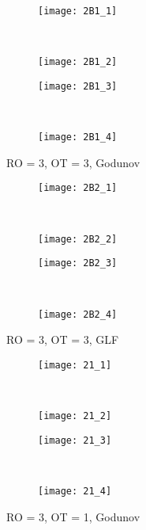 \documentclass[10pt,letterpaper,fleqn]{article}
\begin{document}
\begin{figure}[h!]
        \centering
        \begin{subfigure}[b]{0.4\textwidth}
                \texttt{[image: 2B1\_1]}
        \end{subfigure}%
        ~ 
        \begin{subfigure}[b]{0.4\textwidth}
                \texttt{[image: 2B1\_2]}
        \end{subfigure}
        
        \begin{subfigure}[b]{0.4\textwidth}
                \texttt{[image: 2B1\_3]}
        \end{subfigure}
        ~
        \begin{subfigure}[b]{0.4\textwidth}
                \texttt{[image: 2B1\_4]}
        \end{subfigure}
        \caption{RO = 3, OT = 3, Godunov}
\end{figure}

\begin{figure}[h!]
        \centering
        \begin{subfigure}[b]{0.4\textwidth}
                \texttt{[image: 2B2\_1]}
        \end{subfigure}%
        ~ 
        \begin{subfigure}[b]{0.4\textwidth}
                \texttt{[image: 2B2\_2]}
        \end{subfigure}
        
        \begin{subfigure}[b]{0.4\textwidth}
                \texttt{[image: 2B2\_3]}
        \end{subfigure}
        ~
        \begin{subfigure}[b]{0.4\textwidth}
                \texttt{[image: 2B2\_4]}
        \end{subfigure}
        \caption{RO = 3, OT = 3, GLF}
\end{figure}

\begin{figure}[h!]
        \centering
        \begin{subfigure}[b]{0.4\textwidth}
                \texttt{[image: 21\_1]}
        \end{subfigure}%
        ~ 
        \begin{subfigure}[b]{0.4\textwidth}
                \texttt{[image: 21\_2]}
        \end{subfigure}
        
        \begin{subfigure}[b]{0.4\textwidth}
                \texttt{[image: 21\_3]}
        \end{subfigure}
        ~
        \begin{subfigure}[b]{0.4\textwidth}
                \texttt{[image: 21\_4]}
        \end{subfigure}
        \caption{RO = 3, OT = 1, Godunov}
\end{figure}
\end{document}
